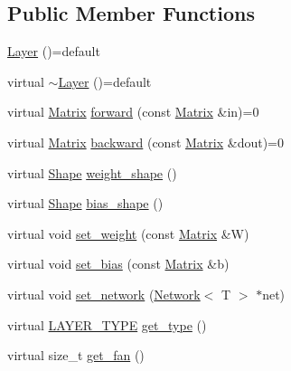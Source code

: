 \subsection*{Public Member Functions}
\begin{DoxyCompactItemize}
\item 
\mbox{\hyperlink{class_layer_a7db1fc76bec3431efbb0984192e2ae23}{Layer}} ()=default
\item 
virtual \mbox{\hyperlink{class_layer_ac2c7d2238eb3d09a2198736c5b10f940}{$\sim$\+Layer}} ()=default
\item 
virtual \mbox{\hyperlink{class_layer_a22b1e7286096aa62bd245536c8ebdaf1}{Matrix}} \mbox{\hyperlink{class_layer_ab15b665c86974b1cf1d7ba4e309cb0e5}{forward}} (const \mbox{\hyperlink{class_layer_a22b1e7286096aa62bd245536c8ebdaf1}{Matrix}} \&in)=0
\item 
virtual \mbox{\hyperlink{class_layer_a22b1e7286096aa62bd245536c8ebdaf1}{Matrix}} \mbox{\hyperlink{class_layer_ac4c13a3a85bfdd4d7d4d18669e3299fe}{backward}} (const \mbox{\hyperlink{class_layer_a22b1e7286096aa62bd245536c8ebdaf1}{Matrix}} \&dout)=0
\item 
virtual \mbox{\hyperlink{class_layer_a8313f42d2292d12dd5d40cc115636693}{Shape}} \mbox{\hyperlink{class_layer_afa0ec609fc7ef0053a362ea54d0f6f78}{weight\+\_\+shape}} ()
\item 
virtual \mbox{\hyperlink{class_layer_a8313f42d2292d12dd5d40cc115636693}{Shape}} \mbox{\hyperlink{class_layer_ad557254136784e9312ebb197b2bd3faf}{bias\+\_\+shape}} ()
\item 
virtual void \mbox{\hyperlink{class_layer_a8fd54bf1a860868b13f4365a264c693c}{set\+\_\+weight}} (const \mbox{\hyperlink{class_layer_a22b1e7286096aa62bd245536c8ebdaf1}{Matrix}} \&W)
\item 
virtual void \mbox{\hyperlink{class_layer_a16eecfdfbd98cb94918b7d19ecaeb740}{set\+\_\+bias}} (const \mbox{\hyperlink{class_layer_a22b1e7286096aa62bd245536c8ebdaf1}{Matrix}} \&b)
\item 
virtual void \mbox{\hyperlink{class_layer_a6281daa82294d6979eaa59acf0ea8f31}{set\+\_\+network}} (\mbox{\hyperlink{class_network}{Network}}$<$ T $>$ $\ast$net)
\item 
virtual \mbox{\hyperlink{layer__base_8hpp_a5f7e99058765b058df158c099200b154}{L\+A\+Y\+E\+R\+\_\+\+T\+Y\+PE}} \mbox{\hyperlink{class_layer_a9a59bb1bd6e1880abc71d9afbfb96496}{get\+\_\+type}} ()
\item 
virtual size\+\_\+t \mbox{\hyperlink{class_layer_a43681206a2ef690667c41423b6b6f20b}{get\+\_\+fan}} ()
\end{DoxyCompactItemize}
